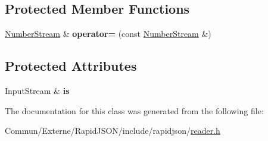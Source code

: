 \subsection*{Protected Member Functions}
\begin{DoxyCompactItemize}
\item 
\hyperlink{class_generic_reader_1_1_number_stream}{Number\+Stream} \& {\bfseries operator=} (const \hyperlink{class_generic_reader_1_1_number_stream}{Number\+Stream} \&)\hypertarget{class_generic_reader_1_1_number_stream_3_01_input_stream_00_01false_01_4_a68106b88990f74f0e8f1d2ead8969015}{}\label{class_generic_reader_1_1_number_stream_3_01_input_stream_00_01false_01_4_a68106b88990f74f0e8f1d2ead8969015}

\end{DoxyCompactItemize}
\subsection*{Protected Attributes}
\begin{DoxyCompactItemize}
\item 
Input\+Stream \& {\bfseries is}\hypertarget{class_generic_reader_1_1_number_stream_3_01_input_stream_00_01false_01_4_a45ee8cfa4bef1124d336b977cc98f80e}{}\label{class_generic_reader_1_1_number_stream_3_01_input_stream_00_01false_01_4_a45ee8cfa4bef1124d336b977cc98f80e}

\end{DoxyCompactItemize}


The documentation for this class was generated from the following file\+:\begin{DoxyCompactItemize}
\item 
Commun/\+Externe/\+Rapid\+J\+S\+O\+N/include/rapidjson/\hyperlink{reader_8h}{reader.\+h}\end{DoxyCompactItemize}
